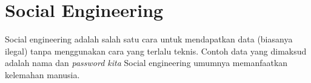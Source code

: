 \chapter{Social Engineering}
Social engineering adalah salah satu cara untuk mendapatkan data
(biasanya ilegal) tanpa menggunakan cara yang terlalu teknis.
Contoh data yang dimaksud adalah nama dan {\em password kita}
Social engineering umumnya memanfaatkan kelemahan manusia.